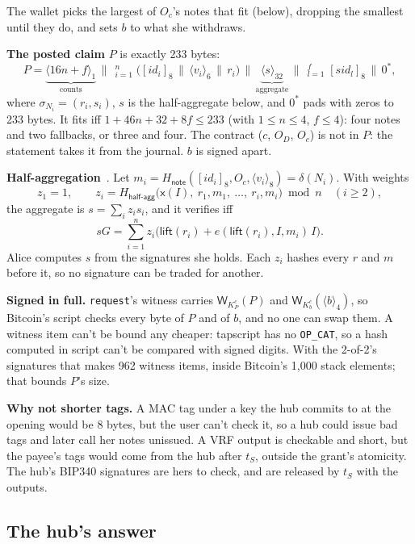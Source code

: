 \documentclass[11pt]{article}
\theoremstyle{plain}
\theoremstyle{definition}
\newcommand{\tx}[1]{\texttt{#1}}
\newcommand{\cat}{\,\|\,}
\newcommand{\be}[2]{\langle #1\rangle_{#2}}          %
\newcommand{\pre}[1]{[#1]_8}                         %
\newcommand{\xo}[1]{\mathsf{x}(#1)}                  %
\newcommand{\Ht}[1]{H_{\textsf{#1}}}                 %
\newcommand{\Wots}{\mathsf{W}}
\newcommand{\sid}{\mathit{sid}}
\newcommand{\Oc}{O_c}
\begin{document}
The wallet picks the largest of $\Oc$'s notes that fit (below),
dropping the smallest until they do, and sets $b$ to what she
withdraws.

\textbf{The posted claim} $P$ is exactly 233 bytes:
\[
  P = \underbrace{\be{16n + f}{1}}_{\text{counts}} \cat
  \mathop{\Big\Vert}_{i=1}^{n} \big(\pre{\mathit{id}_i} \cat \be{v_i}{6} \cat r_i\big) \cat
  \underbrace{\be{s}{32}}_{\text{aggregate}} \cat
  \mathop{\Big\Vert}_{l=1}^{f} \pre{\sid_l} \cat 0^{\ast},
\]
where $\sigma_{N_i} = (r_i, s_i)$, $s$ is the half-aggregate below, and
$0^{\ast}$ pads with zeros to 233 bytes. It fits iff $1 + 46n + 32 + 8f
\le 233$ (with $1 \le n \le 4$, $f \le 4$): four notes and two
fallbacks, or three and four. The contract ($c$, $O_D$, $\Oc$) is not
in $P$: the statement takes it from the journal. $b$ is signed apart.

\textbf{Half-aggregation}~\cite{halfagg1,halfagg2}. Let $m_i =
\Ht{note}(\pre{\mathit{id}_i}, \Oc, \be{v_i}{8}) = \delta(N_i)$. With
weights
\[
  z_1 = 1,\qquad z_i = \Ht{half-agg}\big(\xo{I},\ r_1, m_1,\ \dots,\ r_i,
  m_i\big) \bmod n \quad (i \ge 2),
\]
the aggregate is $s = \sum_i z_i s_i$, and it verifies iff
\[
  sG = \sum_{i=1}^{n} z_i\big(\mathsf{lift}(r_i) + e(\mathsf{lift}(r_i),
  I, m_i)\,I\big).
\]
Alice computes $s$ from the signatures she holds. Each $z_i$ hashes
every $r$ and $m$ before it, so no signature can be traded for another.

\textbf{Signed in full.} \tx{request}'s witness carries
$\Wots_{K_P^c}(P)$ and $\Wots_{K_b^c}(\be{b}{4})$, so Bitcoin's script
checks every byte of $P$ and of $b$, and no one can swap them. A witness
item can't be bound any cheaper: tapscript has no \tx{OP\_CAT}, so a
hash computed in script can't be compared with signed digits. With the
2-of-2's signatures that makes 962 witness items, inside Bitcoin's 1,000
stack elements; that bounds $P$'s size.

\textbf{Why not shorter tags.} A MAC tag under a key the hub commits to
at the opening would be 8 bytes, but the user can't check it, so a hub
could issue bad tags and later call her notes unissued. A VRF output is
checkable and short, but the payee's tags would come from the hub after
$t_S$, outside the grant's atomicity. The hub's BIP340 signatures are
hers to check, and are released by $t_S$ with the outputs.

\subsection{The hub's answer}\label{sec:answer}
\end{document}

